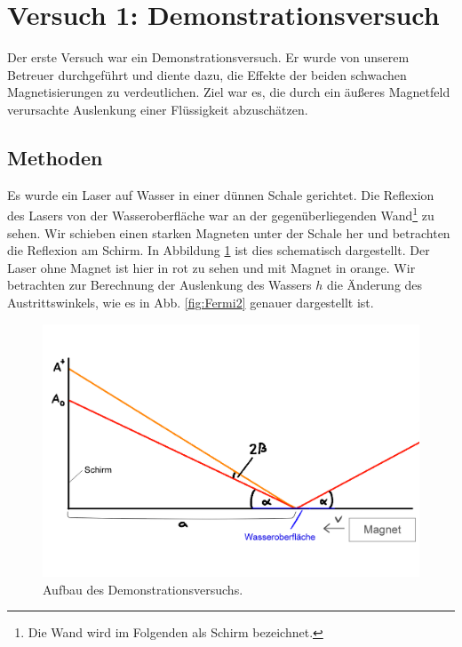 \documentclass[11pt,a4paper,titlepage, ngerman]{article}
\begin{document}
	\section{Versuch 1: Demonstrationsversuch} 
		
		Der erste Versuch war ein Demonstrationsversuch.
		Er wurde von unserem Betreuer durchgeführt und diente dazu, die Effekte der beiden schwachen Magnetisierungen zu verdeutlichen.
		Ziel war es, die durch ein äußeres Magnetfeld verursachte Auslenkung einer Flüssigkeit abzuschätzen.
		
		\subsection*{Methoden} 
		
		Es wurde ein Laser auf Wasser in einer dünnen Schale gerichtet.
		Die Reflexion des Lasers von der Wasseroberfläche war an der gegenüberliegenden Wand\footnote{Die Wand wird im Folgenden als Schirm bezeichnet.} zu sehen.
		Wir schieben einen starken Magneten unter der Schale her und betrachten die Reflexion am Schirm.
		In Abbildung \ref{fig:Fermi1} ist dies schematisch dargestellt.
		Der Laser ohne Magnet ist hier in rot zu sehen und mit Magnet in orange.
		Wir betrachten zur Berechnung der Auslenkung des Wassers $h$ die Änderung des Austrittswinkels, wie es in Abb. \ref{fig:Fermi2} genauer dargestellt ist.
		\begin{figure}[ht]
			\includegraphics[width=\textwidth]{SkizzeFermi1.png}
			\caption{Aufbau des Demonstrationsversuchs.}
			\label{fig:Fermi1}
		\end{figure}
\end{document}
